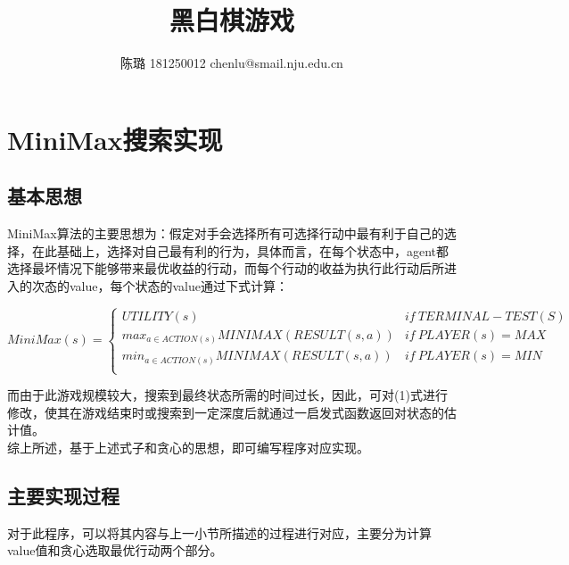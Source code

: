 \documentclass[UTF8]{article}
\begin{document}
	\title{黑白棋游戏}
	\author{陈璐 181250012 chenlu@smail.nju.edu.cn}
	
	\maketitle
	
	\tableofcontents
	
\section{MiniMax搜索实现}
\subsection{基本思想}
	\indent MiniMax算法的主要思想为：假定对手会选择所有可选择行动中最有利于自己的选择，在此基础上，选择对自己最有利的行为，具体而言，在每个状态中，agent都选择最坏情况下能够带来最优收益的行动，而每个行动的收益为执行此行动后所进入的次态的value，每个状态的value通过下式计算：\\
	\begin{footnotesize}
		\begin{equation}
		MiniMax(s)=
		\begin{cases}
		UTILITY(s) & if\ TERMINAL-TEST(S) \\ 
		max_{a\in ACTION(s)}MINIMAX(RESULT(s,a))& if\ PLAYER(s)=MAX \\ 
		min_{a\in ACTION(s)}MINIMAX(RESULT(s,a))& if\ PLAYER(s)=MIN \\
		\end{cases}
		\end{equation}
	\end{footnotesize}

	\indent 而由于此游戏规模较大，搜索到最终状态所需的时间过长，因此，可对(1)式进行修改，使其在游戏结束时或搜索到一定深度后就通过一启发式函数返回对状态的估计值。\\
	\indent 综上所述，基于上述式子和贪心的思想，即可编写程序对应实现。

\subsection{主要实现过程}
	\indent 对于此程序，可以将其内容与上一小节所描述的过程进行对应，主要分为计算value值和贪心选取最优行动两个部分。
	
\end{document}
